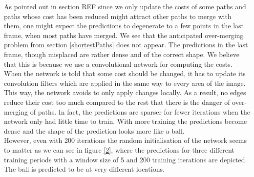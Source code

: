 \documentclass{article}
\begin{document}
As pointed out in section REF since we only update the costs of some paths and paths whose cost has been reduced might attract other paths to merge with them, one might expect the predictions to degenerate to a few points in the last frame, when most paths have merged.
We see that the anticipated over-merging problem from section \ref{shortestPaths} does not appear. The predictions in the last frame, though misplaced are rather dense and of the correct shape. We believe that this is because we use a convolutional network for computing the costs. When the network is told that some cost should be changed, it has to update its convolution filters which are applied in the same way to every area of the image. This way, the network avoids to only apply changes locally. As a result, no edges reduce their cost too much compared to the rest that there is the danger of over-merging of paths. In fact, the predictions are sparser for fewer iterations when the network only had little time to train. With more training the predictions become dense and the shape of the prediction looks more like a ball. 
\\
However, even with 200 iterations the random initialisation of the network seems to matter as we can see in figure \ref{2}, where the predictions for three different training periods with a window size of 5 and 200 training iterations are depicted. The ball is predicted to be at very different locations.\\
 
\end{document}
